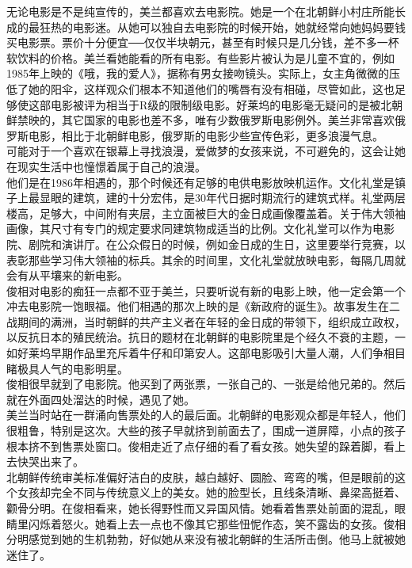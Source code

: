 无论电影是不是纯宣传的，美兰都喜欢去电影院。她是一个在北朝鲜小村庄所能长成的最狂热的电影迷。从她可以独自去电影院的时候开始，她就经常向她妈妈要钱买电影票。票价十分便宜──仅仅半块朝元，甚至有时候只是几分钱，差不多一杯软饮料的价格。美兰看她能看的所有电影。有些影片被认为是儿童不宜的，例如1985年上映的《哦，我的爱人》，据称有男女接吻镜头。实际上，女主角微微的压低了她的阳伞，这样观众们根本不知道他们的嘴唇有没有相碰，尽管如此，这也足够使这部电影被评为相当于R级的限制级电影。好莱坞的电影毫无疑问的是被北朝鲜禁映的，其它国家的电影也差不多，唯有少数俄罗斯电影例外。美兰非常喜欢俄罗斯电影，相比于北朝鲜电影，俄罗斯的电影少些宣传色彩，更多浪漫气息。\\

可能对于一个喜欢在银幕上寻找浪漫，爱做梦的女孩来说，不可避免的，这会让她在现实生活中也憧憬着属于自己的浪漫。\\

他们是在1986年相遇的，那个时候还有足够的电供电影放映机运作。文化礼堂是镇子上最显眼的建筑，建的十分宏伟，是30年代日据时期流行的建筑式样。礼堂两层楼高，足够大，中间附有夹层，主立面被巨大的金日成画像覆盖着。关于伟大领袖画像，其尺寸有专门的规定要求同建筑物成适当的比例。文化礼堂可以作为电影院、剧院和演讲厅。在公众假日的时候，例如金日成的生日，这里要举行竞赛，以表彰那些学习伟大领袖的标兵。其余的时间里，文化礼堂就放映电影，每隔几周就会有从平壤来的新电影。\\

俊相对电影的痴狂一点都不亚于美兰，只要听说有新的电影上映，他一定会第一个冲去电影院一饱眼福。他们相遇的那次上映的是《新政府的诞生》。故事发生在二战期间的满洲，当时朝鲜的共产主义者在年轻的金日成的带领下，组织成立政权，以反抗日本的殖民统治。抗日的题材在北朝鲜的电影院里是个经久不衰的主题，一如好莱坞早期作品里充斥着牛仔和印第安人。这部电影吸引大量人潮，人们争相目睹极具人气的电影明星。\\

俊相很早就到了电影院。他买到了两张票，一张自己的、一张是给他兄弟的。然后就在外面四处溜达的时候，遇见了她。\\

美兰当时站在一群涌向售票处的人的最后面。北朝鲜的电影观众都是年轻人，他们很粗鲁，特别是这次。大些的孩子早就挤到前面去了，围成一道屏障，小点的孩子根本挤不到售票处窗口。俊相走近了点仔细的看了看女孩。她失望的跺着脚，看上去快哭出来了。\\

北朝鲜传统审美标准偏好洁白的皮肤，越白越好、圆脸、弯弯的嘴，但是眼前的这个女孩却完全不同与传统意义上的美女。她的脸型长，且线条清晰、鼻梁高挺着、颧骨分明。在俊相看来，她长得野性而又异国风情。她看着售票处前面的混乱，眼睛里闪烁着怒火。她看上去一点也不像其它那些忸怩作态，笑不露齿的女孩。俊相分明感觉到她的生机勃勃，好似她从来没有被北朝鲜的生活所击倒。他马上就被她迷住了。\\

